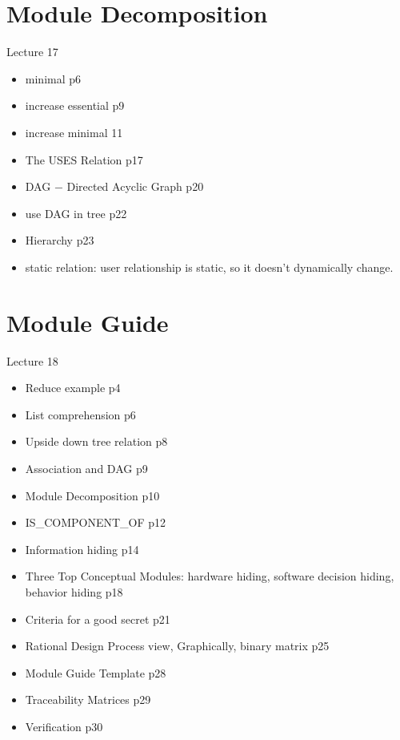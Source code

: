 \documentclass[12pt]{article}
\begin{document}
\section{Module Decomposition}
Lecture 17
\begin{itemize}
    \item minimal p6
    \item increase essential p9
    \item increase minimal 11
    \item The USES Relation p17
    \item DAG $-$ Directed Acyclic Graph p20
    \item use DAG in tree p22 
    \item Hierarchy p23
    \item static relation: user relationship is static, so it doesn’t dynamically change.
\end{itemize}

\section{Module Guide}
Lecture 18
\begin{itemize}
    \item Reduce example p4
    \item List comprehension p6
    \item Upside down tree relation p8
    \item Association and DAG p9
    \item Module Decomposition p10
    \item IS\_COMPONENT\_OF p12
    \item Information hiding p14
    \item Three Top Conceptual Modules: hardware hiding, software decision hiding, behavior hiding p18
    \item Criteria for a good secret p21
    \item Rational Design Process view, Graphically, binary matrix p25
    \item Module Guide Template p28
    \item Traceability Matrices p29
    \item Verification p30
\end{itemize}
\end{document}
